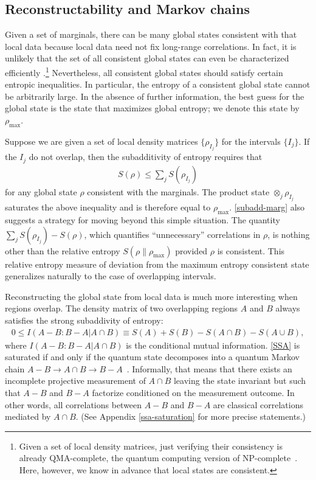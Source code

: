 \documentclass[12pt]{article}
\def\bea{\begin{eqnarray}}
\def\eea{\end{eqnarray}}
\begin{document}
\subsection{Reconstructability and Markov chains}

Given a set of marginals, there can be many global states consistent with that local data because local data need not fix long-range correlations.
In fact, it is unlikely that the set of all consistent global states can even be characterized efficiently \cite{poulin2011markov}.\footnote{Given a set of local density matrices, just verifying their consistency is already QMA-complete, the quantum computing version of NP-complete~\cite{liu2006consistency}. Here, however, we know in advance that local states are consistent.
} Nevertheless, all consistent global states should satisfy certain entropic inequalities. In particular, the entropy of a consistent global state cannot be arbitrarily large. In the absence of further information, the best guess for the global state is the state that maximizes global entropy; we denote this state by $\rho_{\max}$.

Suppose we are given a set of local density matrices $\{ \rho_{I_j} \}$ for the intervals $\{ I_j \}$. If the $I_j$ do not overlap, then the subadditivity of entropy requires that
\bea \label{subadd-marg}
S(\rho)\leq \sum_j S(\rho_{I_j})
\eea
for any global state $\rho$ consistent with the marginals.
The product state $\otimes_j \rho_{I_j}$ saturates the above inequality and is therefore equal to $\rho_{\max}$. \eqref{subadd-marg} also suggests a strategy for moving beyond this simple situation. The quantity $\sum_j S(\rho_{I_j}) - S(\rho)$, which quantifies ``unnecessary'' correlations in $\rho$, is nothing other than the relative entropy $S(\rho \| \rho_{\max} )$ provided $\rho$ is consistent. This relative entropy measure of deviation from the maximum entropy consistent state generalizes naturally to the case of overlapping intervals.


Reconstructing the global state from local data is much more interesting when regions overlap. The density matrix of two overlapping regions $A$ and $B$ always satisfies the strong subaddivity of entropy:
\bea\label{SSA}
0\leq I(A -B : B - A|A\cap B)\equiv S(A)+S(B)-S(A\cap B)-S(A\cup B),
\eea
where $I(A-B:B-A|A\cap B)$ is the conditional mutual information. \eqref{SSA} is saturated if and only if the quantum state decomposes into a quantum Markov chain $A-B \rightarrow A \cap B \rightarrow B - A$~\cite{hayden2004structure,fawzi2014quantum}. Informally, that means that there exists an incomplete projective measurement of $A \cap B$ leaving the state invariant but such that $A - B$ and $B-A$ factorize conditioned on the measurement outcome.  In other words, all correlations between $A-B$ and $B-A$ are classical correlations mediated by $A\cap B$.
(See Appendix \ref{ssa-saturation} for more precise statements.)
\end{document}

